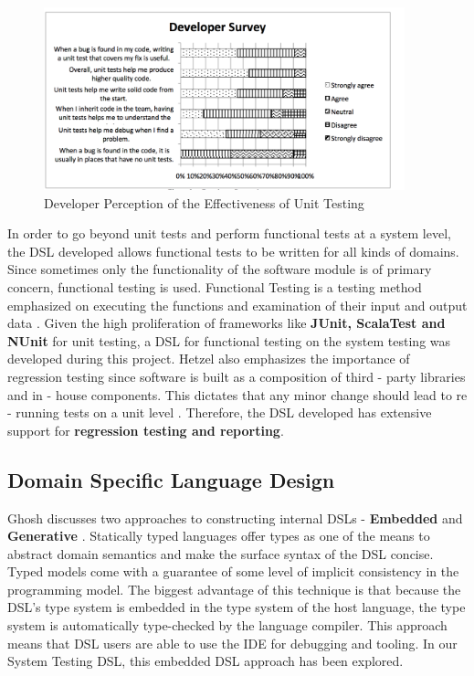 \documentclass[12pt]{article}
\begin{document}
\begin{figure}[H]
  \centering
    \includegraphics[height=200px]{figures/developer_perception.png}
  \caption{Developer Perception of the Effectiveness of Unit Testing}
\end{figure}

\noindent
In order to go beyond unit tests and perform functional tests at a system level, the DSL developed allows functional tests to be written for all kinds of domains. Since sometimes only the functionality of the software module is of primary concern, functional testing is used. Functional Testing is a testing method emphasized on executing the functions and examination of their input and output data \cite{Hetzel88}. Given the high proliferation of frameworks like \textbf{JUnit, ScalaTest and NUnit} for unit testing, a DSL for functional testing on the system testing was developed during this project. Hetzel also emphasizes the importance of regression testing since software is built as a composition of third - party libraries and in - house components. This dictates that any minor change should lead to re - running tests on a unit level \cite{Hetzel88}. Therefore, the DSL developed has extensive support for \textbf{regression testing and reporting}.

\subsection{Domain Specific Language Design}
Ghosh discusses two approaches to constructing internal DSLs - \textbf{Embedded} and \textbf{Generative} \cite{dslsInAction}. Statically typed languages offer types as one of the means to abstract domain semantics and make the surface syntax of the DSL concise. Typed models come with a
guarantee of some level of implicit consistency in the programming model. The biggest advantage of this technique is that because the DSL’s type system is embedded in the type system of the host language, the type system is automatically type-checked by the language compiler. This approach means that DSL users are able to use the IDE for debugging and tooling. In our System Testing DSL, this embedded DSL approach has been explored. 
\bigskip
\end{document}
